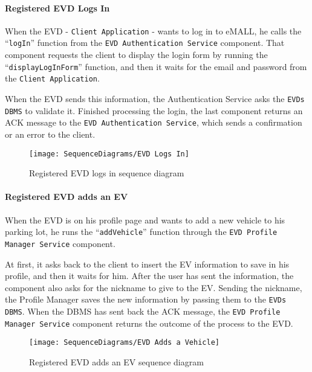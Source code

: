 \paragraph{Registered EVD Logs In}
When the EVD - \verb|Client Application| - wants to log in to eMALL, he calls the ``\verb|logIn|'' function from the \verb|EVD Authentication Service| component.
That component requests the client to display the login form by running the ``\verb|displayLogInForm|'' function, and then it waits for the email and password from the \verb|Client Application|.

When the EVD sends this information, the Authentication Service asks the \verb|EVDs DBMS| to validate it.
Finished processing the login, the last component returns an ACK message to the \verb|EVD Authentication Service|, which sends a confirmation or an error to the client.
\begin{figure}[H]
    \begin{center}
        \texttt{[image: SequenceDiagrams/EVD Logs In]}
        \caption{Registered EVD logs in sequence diagram}
        \label{fig:evd_logs_in}
    \end{center}
\end{figure}

\paragraph{Registered EVD adds an EV}
When the EVD is on his profile page and wants to add a new vehicle to his parking lot, he runs the ``\verb|addVehicle|'' function through the \verb|EVD Profile Manager Service| component.

At first, it asks back to the client to insert the EV information to save in his profile, and then it waits for him.
After the user has sent the information, the component also asks for the nickname to give to the EV\@.
Sending the nickname, the Profile Manager saves the new information by passing them to the \verb|EVDs DBMS|\@.
When the DBMS has sent back the ACK message, the \verb|EVD Profile Manager Service| component returns the outcome of the process to the EVD\@.
\begin{figure}[H]
    \begin{center}
        \texttt{[image: SequenceDiagrams/EVD Adds a Vehicle]}
        \caption{Registered EVD adds an EV sequence diagram}
        \label{fig:evd_adds_vehicle}
    \end{center}
\end{figure}

